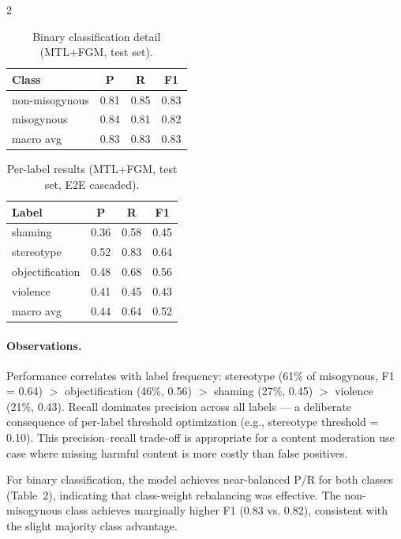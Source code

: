 \documentclass[11pt]{article}
\begin{document}
\begin{multicols}{2}
\begin{table}[h]
\small
\centering
\caption{Binary classification detail (MTL+FGM, test set).}
\begin{tabular}{lccc}
\toprule
\textbf{Class} & \textbf{P} & \textbf{R} & \textbf{F1} \\
\midrule
non-misogynous & 0.81 & 0.85 & 0.83 \\
misogynous     & 0.84 & 0.81 & 0.82 \\
\midrule
macro avg      & 0.83 & 0.83 & 0.83 \\
\bottomrule
\end{tabular}
\end{table}

\begin{table}[h]
\small
\centering
\caption{Per-label results (MTL+FGM, test set, E2E cascaded).}
\begin{tabular}{lccc}
\toprule
\textbf{Label} & \textbf{P} & \textbf{R} & \textbf{F1} \\
\midrule
shaming        & 0.36 & 0.58 & 0.45 \\
stereotype     & 0.52 & 0.83 & 0.64 \\
objectification& 0.48 & 0.68 & 0.56 \\
violence       & 0.41 & 0.45 & 0.43 \\
\midrule
macro avg      & 0.44 & 0.64 & 0.52 \\
\bottomrule
\end{tabular}
\end{table}

\paragraph{Observations.}
Performance correlates with label frequency: stereotype (61\% of misogynous, F1 = 0.64) $>$ objectification (46\%, 0.56) $>$ shaming (27\%, 0.45) $>$ violence (21\%, 0.43). Recall dominates precision across all labels — a deliberate consequence of per-label threshold optimization (e.g., stereotype threshold = 0.10). This precision–recall trade-off is appropriate for a content moderation use case where missing harmful content is more costly than false positives.

For binary classification, the model achieves near-balanced P/R for both classes (Table~2), indicating that class-weight rebalancing was effective. The non-misogynous class achieves marginally higher F1 (0.83 vs. 0.82), consistent with the slight majority class advantage.


\end{multicols}
\end{document}

